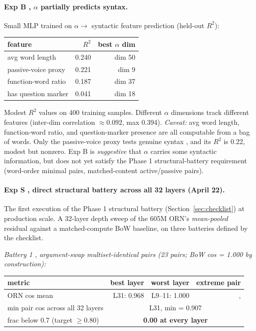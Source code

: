 \documentclass[10pt, twocolumn, a4paper]{article}
\begin{document}
\paragraph{Exp B ,  $\alpha$ partially predicts syntax.} Small MLP trained on $\alpha \to$ syntactic feature prediction (held-out $R^2$):
\begin{center}\small
\begin{tabular}{lrr}
\toprule
feature & $R^2$ & best $\alpha$ dim \\
\midrule
avg word length          & 0.240 & dim 50 \\
passive-voice proxy      & 0.221 & dim 9 \\
function-word ratio      & 0.187 & dim 37 \\
has question marker      & 0.041 & dim 18 \\
\bottomrule
\end{tabular}
\end{center}
Modest $R^2$ values on 400 training samples. Different $\alpha$ dimensions track different features (inter-dim correlation $\approx 0.092$, max 0.394). \emph{Caveat:} avg word length, function-word ratio, and question-marker presence are all computable from a bag of words. Only the passive-voice proxy tests genuine syntax ,  and its $R^2$ is 0.22, modest but nonzero. Exp B is \emph{suggestive} that $\alpha$ carries some syntactic information, but does not yet satisfy the Phase 1 structural-battery requirement (word-order minimal pairs, matched-content active/passive pairs).

\paragraph{Exp S ,  direct structural battery across all 32 layers (April 22).} The first execution of the Phase 1 structural battery (Section~\ref{sec:checklist}) at production scale. A 32-layer depth sweep of the 605M ORN's \emph{mean-pooled} residual against a matched-compute BoW baseline, on three batteries defined by the checklist.

\emph{Battery 1 ,  argument-swap multiset-identical pairs (23 pairs; BoW cos = 1.000 by construction):}

\begin{center}\small
\begin{tabular}{lrrr}
\toprule
metric & best layer & worst layer & extreme pair \\
\midrule
ORN cos mean & L31: 0.968 & L9--11: 1.000 & ,  \\
min pair cos across all 32 layers & \multicolumn{3}{c}{L31, min = 0.907} \\
frac below 0.7 (target $\geq 0.80$) & \multicolumn{3}{c}{\textbf{0.00 at every layer}} \\
\bottomrule
\end{tabular}
\end{center}
\end{document}
